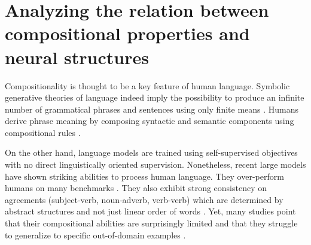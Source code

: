 \setchapterpreamble[u]{\margintoc}
\chapter{Analyzing the relation between compositional properties and neural structures}


Compositionality is thought to be a key feature of human language. Symbolic generative theories of language indeed imply the possibility to produce an infinite number of grammatical phrases and sentences using only finite means . Humans derive phrase meaning by composing syntactic and semantic components using compositional rules \parencite{partee_84, cann_93, dowty_07}. %

On the other hand, language models are trained using self-supervised objectives with no direct linguistically oriented supervision. Nonetheless, recent large  models have shown striking abilities to process human language. They over-perform humans on many benchmarks \parencite{devlin_19, brown_20}. They also exhibit strong consistency on agreements (subject-verb, noun-adverb, verb-verb) which are determined by abstract structures and not just linear order of words \parencite{linzen_16, gulordava_18, marvin_18, newman_21}. Yet, many studies point that their compositional abilities are surprisingly limited and that they struggle to generalize to specific out-of-domain examples \parencite{lake_18, kim_20, hupkes_20}. 

